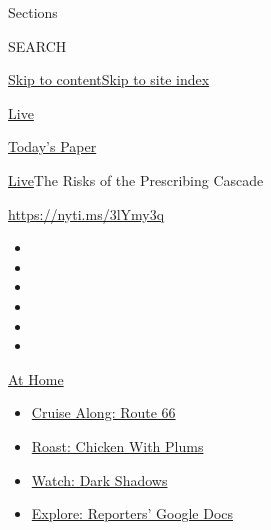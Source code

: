 Sections

SEARCH

\protect\hyperlink{site-content}{Skip to
content}\protect\hyperlink{site-index}{Skip to site index}

\href{https://www.nytimes3xbfgragh.onion/section/well/live}{Live}

\href{https://myaccount.nytimes3xbfgragh.onion/auth/login?response_type=cookie\&client_id=vi}{}

\href{https://www.nytimes3xbfgragh.onion/section/todayspaper}{Today's
Paper}

\href{/section/well/live}{Live}\textbar{}The Risks of the Prescribing
Cascade

\url{https://nyti.ms/3lYmy3q}

\begin{itemize}
\item
\item
\item
\item
\item
\item
\end{itemize}

\href{https://www.nytimes3xbfgragh.onion/spotlight/at-home?action=click\&pgtype=Article\&state=default\&region=TOP_BANNER\&context=at_home_menu}{At
Home}

\begin{itemize}
\tightlist
\item
  \href{https://www.nytimes3xbfgragh.onion/2020/09/07/travel/route-66.html?action=click\&pgtype=Article\&state=default\&region=TOP_BANNER\&context=at_home_menu}{Cruise
  Along: Route 66}
\item
  \href{https://www.nytimes3xbfgragh.onion/2020/09/04/dining/sheet-pan-chicken.html?action=click\&pgtype=Article\&state=default\&region=TOP_BANNER\&context=at_home_menu}{Roast:
  Chicken With Plums}
\item
  \href{https://www.nytimes3xbfgragh.onion/2020/09/04/arts/television/dark-shadows-stream.html?action=click\&pgtype=Article\&state=default\&region=TOP_BANNER\&context=at_home_menu}{Watch:
  Dark Shadows}
\item
  \href{https://www.nytimes3xbfgragh.onion/interactive/2020/at-home/even-more-reporters-editors-diaries-lists-recommendations.html?action=click\&pgtype=Article\&state=default\&region=TOP_BANNER\&context=at_home_menu}{Explore:
  Reporters' Google Docs}
\end{itemize}


